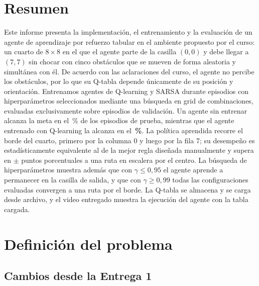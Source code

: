\documentclass[11pt,letterpaper]{article}
\begin{document}

\section*{Resumen}

Este informe presenta la implementación, el entrenamiento y la evaluación de un agente de aprendizaje por
refuerzo tabular en el ambiente propuesto por el curso: un cuarto de $8\times8$ en el que el agente parte de la
casilla $(0,0)$ y debe llegar a $(7,7)$ sin chocar con cinco obstáculos que se mueven de forma aleatoria y
simultánea con él. De acuerdo con las aclaraciones del curso, el agente no percibe los obstáculos, por lo que su
Q-tabla depende únicamente de su posición y orientación. Entrenamos agentes de Q-learning y SARSA durante
\Episodios{} episodios con hiperparámetros seleccionados mediante una búsqueda en grid de \GridTotal{}
combinaciones, evaluadas exclusivamente sobre episodios de validación. Un agente sin entrenar alcanza la meta en
el \RandExito\,\% de los episodios de prueba, mientras que el agente entrenado con Q-learning la alcanza en el
\textbf{\QLExito\,\%}. La política aprendida recorre el borde del cuarto, primero por la columna 0 y luego por la
fila 7; su desempeño es estadísticamente equivalente al de la mejor regla diseñada manualmente y supera en
\DifQLEsc{} $\pm$ \DifQLEscci{} puntos porcentuales a una ruta en escalera por el centro. La búsqueda de
hiperparámetros muestra además que con $\gamma\le0{,}95$ el agente aprende a permanecer en la casilla de salida,
y que con $\gamma\ge0{,}99$ todas las configuraciones evaluadas convergen a una ruta por el borde. La Q-tabla se
almacena y se carga desde archivo, y el video entregado muestra la ejecución del agente con la tabla cargada.

\section{Definición del problema}

\subsection{Cambios desde la Entrega 1}
\end{document}
